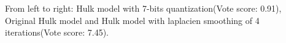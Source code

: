From left to right: Hulk model with 7-bits quantization(Vote score: 0.91), Original Hulk model and Hulk model with laplacien smoothing of 4 iterations(Vote score: 7.45).